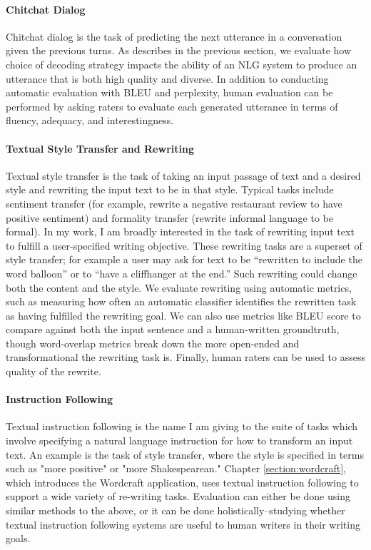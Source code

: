 \begin{itemize}
\paragraph{Chitchat Dialog}
Chitchat dialog is the task of predicting the next utterance in a conversation given the previous turns.
As describes in the previous section, we evaluate how choice of decoding strategy impacts the ability of an NLG system to produce an utterance that is both high quality and diverse.
In addition to conducting automatic evaluation with BLEU and perplexity, human evaluation can be performed by asking raters to evaluate each generated utterance in terms of fluency, adequacy, and interestingness.

\paragraph{Textual Style Transfer and Rewriting}
Textual style transfer is the task of taking an input passage of text and a desired style and rewriting the input text to be in that style.
Typical tasks include sentiment transfer (for example, rewrite a negative restaurant review to have positive sentiment) and formality transfer (rewrite informal language to be formal).
In my work, I am broadly interested in the task of rewriting input text to fulfill a user-specified writing objective.
These rewriting tasks are a superset of style transfer; for example a user may ask for text to be ``rewritten to include the word 
balloon'' or to ``have a cliffhanger at the end.''
Such rewriting could change both the content and the style.
We evaluate rewriting using automatic metrics, such as measuring how often an automatic classifier identifies the rewritten task as having fulfilled the rewriting goal.
We can also use metrics like BLEU score to compare against both the input sentence and a human-written groundtruth, though word-overlap metrics break down the more open-ended and transformational the rewriting task is.
Finally, human raters can be used to assess quality of the rewrite.

\paragraph{Instruction Following}
Textual instruction following is the name I am giving to the suite of tasks which involve specifying a natural language instruction for how to transform an input text.
An example is the task of style transfer, where the style is specified in terms such as "more positive" or "more Shakespearean."
Chapter \ref{section:wordcraft}, which introduces the Wordcraft application, uses textual instruction following to support a wide variety of re-writing tasks.
Evaluation can either be done using similar methods to the above, or it can be done holistically--studying whether textual instruction following systems are useful to human writers in their writing goals.


\end{itemize}
